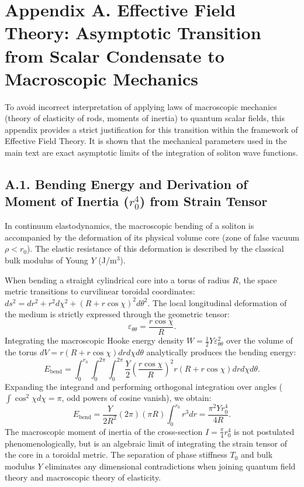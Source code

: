 \documentclass[11pt,a4paper]{article}
\begin{document}
\section*{Appendix A. Effective Field Theory: Asymptotic Transition from Scalar Condensate to Macroscopic Mechanics}
	To avoid incorrect interpretation of applying laws of macroscopic mechanics (theory of elasticity of rods, moments of inertia) to quantum scalar fields, this appendix provides a strict justification for this transition within the framework of Effective Field Theory. It is shown that the mechanical parameters used in the main text are exact asymptotic limits of the integration of soliton wave functions.
	
\subsection*{A.1. Bending Energy and Derivation of Moment of Inertia ($r_0^4$) from Strain Tensor}
	In continuum elastodynamics, the macroscopic bending of a soliton is accompanied by the deformation of its physical volume core (zone of false vacuum $\rho < r_0$). The elastic resistance of this deformation is described by the classical bulk modulus of Young $Y$ (J/m$^3$).
	
	When bending a straight cylindrical core into a torus of radius $R$, the space metric transitions to curvilinear toroidal coordinates: $ds^2 = dr^2 + r^2 d\chi^2 + (R + r\cos\chi)^2 d\theta^2$.
	The local longitudinal deformation of the medium is strictly expressed through the geometric tensor:
	\begin{equation}
		\varepsilon_{\theta\theta} = \frac{r \cos\chi}{R}.
	\end{equation}
	Integrating the macroscopic Hooke energy density $W = \frac{1}{2} Y \varepsilon_{\theta\theta}^2$ over the volume of the torus $dV = r(R + r\cos\chi) dr d\chi d\theta$ analytically produces the bending energy:
	\begin{equation}
		E_{\text{bend}} = \int_0^{r_0} \int_0^{2\pi} \int_0^{2\pi} \frac{Y}{2} \left( \frac{r \cos\chi}{R} \right)^2 r(R + r\cos\chi) dr d\chi d\theta.
	\end{equation}
	Expanding the integrand and performing orthogonal integration over angles ($\int \cos^2\chi d\chi = \pi$, odd powers of cosine vanish), we obtain:
	\begin{equation}
		E_{\text{bend}} = \frac{Y}{2 R^2} (2\pi) (\pi R) \int_0^{r_0} r^3 dr = \frac{\pi^2 Y r_0^4}{4 R}.
	\end{equation}
	The macroscopic moment of inertia of the cross-section $I = \frac{\pi}{4} r_0^4$ is not postulated phenomenologically, but is an algebraic limit of integrating the strain tensor of the core in a toroidal metric. The separation of phase stiffness $T_0$ and bulk modulus $Y$ eliminates any dimensional contradictions when joining quantum field theory and macroscopic theory of elasticity.
	
\end{document}
